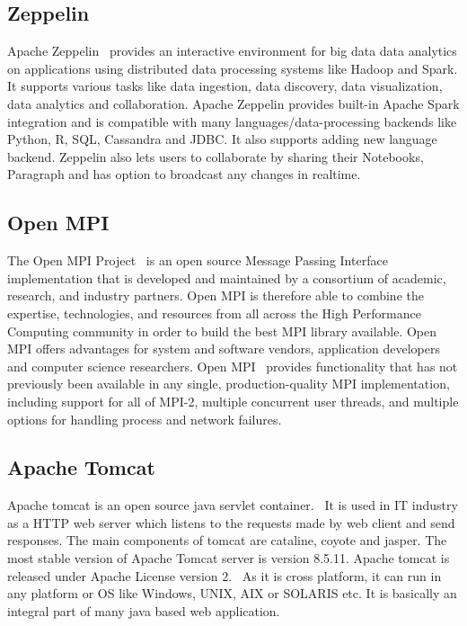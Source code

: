 {\subsection{Zeppelin \cv}

Apache Zeppelin~\cite{www-zeppelinwebsite} provides an interactive
environment for big data data analytics on applications using
distributed data processing systems like Hadoop and Spark. It supports
various tasks like data ingestion, data discovery, data visualization,
data analytics and collaboration. Apache Zeppelin provides built-in
Apache Spark integration and is compatible with many
languages/data-processing backends like Python, R, SQL, Cassandra and
JDBC. It also supports adding new language backend. Zeppelin also lets
users to collaborate by sharing their Notebooks, Paragraph and has
option to broadcast any changes in realtime.

\subsection{Open MPI \cv}

The Open MPI Project~\cite{www-open-mpi} is an open source Message
Passing Interface implementation that is developed and maintained by a
consortium of academic, research, and industry partners. Open MPI is
therefore able to combine the expertise, technologies, and resources
from all across the High Performance Computing community in order to
build the best MPI library available. Open MPI offers advantages for
system and software vendors, application developers and computer
science researchers. Open MPI~\cite{open-mpi-paper-2004} provides
functionality that has not previously been available in any single,
production-quality MPI implementation, including support for all of
MPI-2, multiple concurrent user threads, and multiple options for
handling process and network failures.

\subsection{Apache Tomcat \cv}

Apache tomcat is an open source java servlet
container.~\cite{www-tomcat-official} It is used in IT industry as a
HTTP web server which listens to the requests made by web client and
send responses. The main components of tomcat are cataline, coyote and
jasper. The most stable version of Apache Tomcat server is version
8.5.11. Apache tomcat is released under Apache License version
2.~\cite{www-tomcat-wiki} As it is cross platform, it can run in any
platform or OS like Windows, UNIX, AIX or SOLARIS etc. It is basically
an integral part of many java based web application.

}
